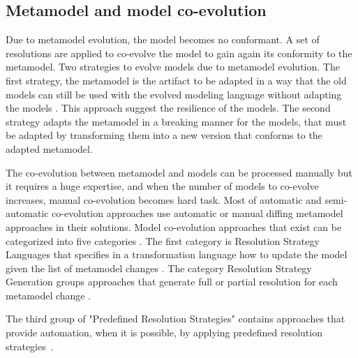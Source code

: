 \subsection{Metamodel and model co-evolution}
Due to metamodel evolution, the model becomes no conformant. A set of resolutions are applied to co-evolve the model to gain again its conformity to the metamodel.
Two strategies to evolve models due to metamodel evolution. 
The first strategy, the metamodel is the artifact to be adapted in a way that the old models can still be used with the evolved modeling language without adapting the models \cite{herrmannsdoerfer2009cope}. This approach suggest the resilience of the models. The second strategy adapts the metamodel in a breaking manner for the models, that must be adapted by transforming them into a new version that conforms to the adapted metamodel.

 The co-evolution between metamodel and models can be processed manually but it requires a huge expertise, and when the number of models to co-evolve increases, manual co-evolution becomes hard task. 
 Most of automatic and semi-automatic co-evolution  approaches use automatic or manual diffing metamodel approaches in their solutions. Model co-evolution approaches that exist can be categorized into five categories \cite{Hebig2017}. The first category is Resolution Strategy Languages that specifies in a transformation language how to update the model given the list of metamodel changes \cite{10.1007/978-3-540-87875-9_44,sprinkle2004domain,wimmer2010using,10.1007/978-3-642-30476-7_13,10.1007/978-3-642-38883-5_10,10.1007/s10270-012-0313-5,10.1007/s10270-012-0296-2}. The category Resolution Strategy Generation groups approaches that generate full or partial resolution for each metamodel change \cite{del2007semi,de2008generating,garces2009managing,meyers2011generic,anguel2014using}.
 
 
 The third group of "Predefined Resolution Strategies" contains approaches that provide automation, when it is possible, by applying predefined resolution strategies \cite{hossler2005coevolution,florez2012coevolution,fernandez2013adapting,wachsmuth2007metamodel,cicchetti2009managing,van2011generic,becker2007process,herrmannsdoerfer2009operation,wittern2013determining}. 
 
